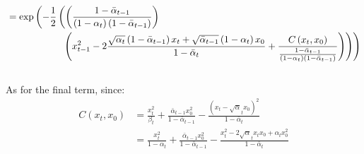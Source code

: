 \documentclass{article}
\numberwithin{equation}{section}
\numberwithin{figure}{section}
\begin{document}
\begin{align}
  &= \exp \left(- \frac{1}{2} \left( \left(\frac{1 - \bar{\alpha}_{t-1}}{\left(1 - \alpha_t\right)\left(1 - \bar{\alpha}_{t-1}\right)}\right)  \right. \right. \\
  &\hspace{2cm} \left. \left. \left(x_{t-1}^2 - 2 \frac{\sqrt{\alpha_t} \left(1 - \bar{\alpha}_{t-1}\right) x_t + \sqrt{\bar{\alpha}_{t-1}}\left(1 - \alpha_t\right) x_0}{1 - \bar{\alpha}_t} + \frac{C\left(x_t, x_0\right)}{\frac{1 - \bar{\alpha}_{t-1}}{\left(1 - \alpha_t\right)\left(1 - \bar{\alpha}_{t-1}\right)}}\right) \right) \right) \notag 
\end{align}
\\
As for the final term, since:
\begin{align}
  C \left(x_t, x_0\right) &= \frac{x_t^2}{\beta_t} + \frac{\bar{\alpha}_{t-1} x_0^2}{1 - \bar{\alpha}_{t-1}} - \frac{\left(x_t - \sqrt{\alpha}_t x_0\right)^2}{1 - \bar{\alpha}_{t}} \\
  &= \frac{x_t^2}{1 - \alpha_t} + \frac{\bar{\alpha}_{t-1} x_0^2}{1 - \bar{\alpha}_{t-1}} - \frac{x_t^2 - 2 \sqrt{\alpha}_t x_t x_0 + \alpha_t x_0^2}{1 - \bar{\alpha}_{t}}
\end{align}
\end{document}
